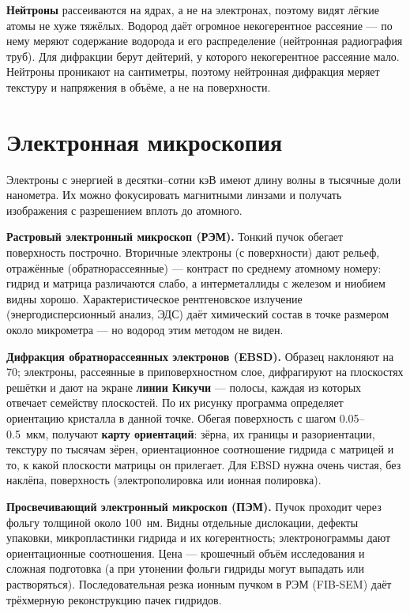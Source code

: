 \textbf{Нейтроны} рассеиваются на ядрах, а не на электронах, поэтому видят лёгкие атомы не хуже тяжёлых. Водород даёт
огромное некогерентное рассеяние --- по нему меряют содержание водорода и его распределение (нейтронная
радиография труб). Для дифракции берут дейтерий, у которого некогерентное рассеяние мало. Нейтроны проникают на
сантиметры, поэтому нейтронная дифракция меряет текстуру и напряжения в объёме, а не на поверхности.

\section{Электронная микроскопия}

Электроны с энергией в десятки--сотни кэВ имеют длину волны в тысячные доли нанометра. Их можно фокусировать
магнитными линзами и получать изображения с разрешением вплоть до атомного.

\textbf{Растровый электронный микроскоп (РЭМ).} Тонкий пучок обегает поверхность построчно. Вторичные электроны (с
поверхности) дают рельеф, отражённые (обратнорассеянные) --- контраст по среднему атомному номеру: гидрид и
матрица различаются слабо, а интерметаллиды с железом и ниобием видны хорошо. Характеристическое рентгеновское
излучение (энергодисперсионный анализ, ЭДС) даёт химический состав в точке размером около микрометра --- но
водород этим методом не виден.

\textbf{Дифракция обратнорассеянных электронов (EBSD).} Образец наклоняют на 70\textdegree; электроны, рассеянные в
приповерхностном слое, дифрагируют на плоскостях решётки и дают на экране \textbf{линии Кикучи} --- полосы, каждая из
которых отвечает семейству плоскостей. По их рисунку программа определяет ориентацию кристалла в данной точке.
Обегая поверхность с шагом 0.05--0.5~мкм, получают \textbf{карту ориентаций}: зёрна, их границы и разориентации,
текстуру по тысячам зёрен, ориентационное соотношение гидрида с матрицей и то, к какой плоскости матрицы он
прилегает. Для EBSD нужна очень чистая, без наклёпа, поверхность (электрополировка или ионная полировка).

\textbf{Просвечивающий электронный микроскоп (ПЭМ).} Пучок проходит через фольгу толщиной около 100~нм. Видны отдельные
дислокации, дефекты упаковки, микропластинки гидрида и их когерентность; электронограммы дают ориентационные
соотношения. Цена --- крошечный объём исследования и сложная подготовка (а при утонении фольги гидриды могут
выпадать или растворяться). Последовательная резка ионным пучком в РЭМ (FIB-SEM) даёт трёхмерную реконструкцию
пачек гидридов.

